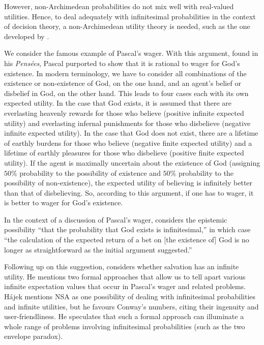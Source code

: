 However, non-Archimedean probabilities do not mix well with real-valued utilities. Hence, to deal adequately with infinitesimal probabilities in the context of decision theory, a non-Archimedean utility theory is needed, such as the one developed by \citet{Pivato:2014}.

We consider the famous example of Pascal's wager. With this argument, found in his \textit{Pens{\'{e}}es}, Pascal purported to show that it is rational to wager for God's existence. In modern terminology, we have to consider all combinations of the existence or non-existence of God, on the one hand, and an agent's belief or disbelief in God, on the other hand. This leads to four cases each with its own expected utility. In the case that God exists, it is assumed that there are everlasting heavenly rewards for those who believe (positive infinite expected utility) and everlasting infernal punishments for those who disbelieve (negative infinite expected utility). In the case that God does not exist, there are a lifetime of earthly burdens for those who believe (negative finite expected utility) and a lifetime of earthly pleasures for those who disbelieve (positive finite expected utility). If the agent is maximally uncertain about the existence of God (assigning $50\%$ probability to the possibility of existence and $50\%$ probability to the possibility of non-existence), the expected utility of believing is infinitely better than that of disbelieving. So, according to this argument, if one has to wager, it is better to wager for God's existence.

In the context of a discussion of Pascal's wager, \citet[p.~163]{Oppy:1990} considers the epistemic possibility ``that the probability that God exists is infinitesimal,'' in which case ``the calculation of the expected return of a bet on [the existence of] God is no longer as straightforward as the initial argument suggested.''

Following up on this suggestion, \citet{Hajek:2003b} considers whether salvation has an infinite utility. He mentions two formal approaches that allow us to tell apart various infinite expectation values that occur in Pascal's wager and related problems. H\'{a}jek mentions NSA as one possibility of dealing with infinitesimal probabilities and infinite utilities, but he favours Conway's numbers, citing their ingenuity and user-friendliness. He speculates that such a formal approach can illuminate a whole range of problems involving infinitesimal probabilities (such as the two envelope paradox).

